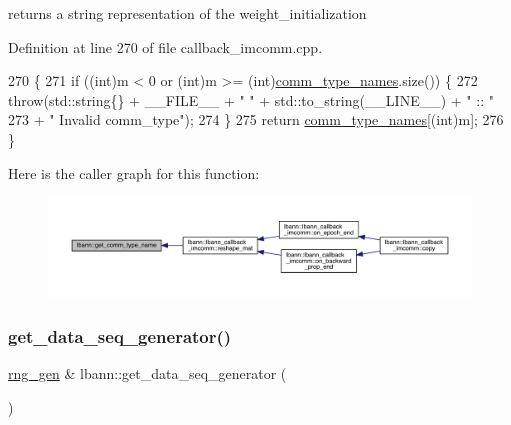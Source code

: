 returns a string representation of the weight\+\_\+initialization 

Definition at line 270 of file callback\+\_\+imcomm.\+cpp.


\begin{DoxyCode}
270                                                                \{
271   \textcolor{keywordflow}{if} ((\textcolor{keywordtype}{int})m < 0 or (\textcolor{keywordtype}{int})m >= (\textcolor{keywordtype}{int})\hyperlink{namespacelbann_add9e1dd52afa73f994d5d3a44c25a818}{comm\_type\_names}.size()) \{
272     \textcolor{keywordflow}{throw}(std::string\{\} + \_\_FILE\_\_ + \textcolor{stringliteral}{" "} + std::to\_string(\_\_LINE\_\_) + \textcolor{stringliteral}{" :: "}
273            + \textcolor{stringliteral}{" Invalid comm\_type"});
274   \}
275   \textcolor{keywordflow}{return} \hyperlink{namespacelbann_add9e1dd52afa73f994d5d3a44c25a818}{comm\_type\_names}[(int)m];
276 \}
\end{DoxyCode}
Here is the caller graph for this function\+:\nopagebreak
\begin{figure}[H]
\begin{center}
\leavevmode
\includegraphics[width=350pt]{namespacelbann_ab5665dc52c53faca0caa55b509e2e654_icgraph}
\end{center}
\end{figure}
\mbox{\label{namespacelbann_aba9d11cb3a739cd84e7234ceeb32d098}} 
\subsubsection{\texorpdfstring{get\+\_\+data\+\_\+seq\+\_\+generator()}{get\_data\_seq\_generator()}}
{\footnotesize\ttfamily \hyperlink{namespacelbann_aab7fa584bac85b9085aa8b8c5a888356}{rng\+\_\+gen} \& lbann\+::get\+\_\+data\+\_\+seq\+\_\+generator (\begin{DoxyParamCaption}{ }\end{DoxyParamCaption})}

